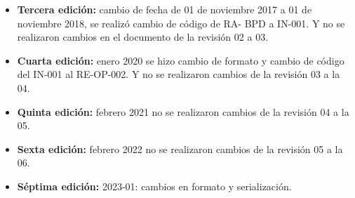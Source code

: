 \begin{itemize}
	\item \textbf{Tercera edición:} cambio de fecha de 01 de noviembre 2017 a 01 de noviembre 2018, se realizó cambio de código de RA- BPD a IN-001. Y no se realizaron cambios en el documento de la revisión 02 a 03.
	\item \textbf{Cuarta edición:} enero 2020 se hizo cambio de formato y cambio de código del IN-001 al RE-OP-002. Y no se realizaron cambios de la revisión 03 a la 04.
	\item \textbf{Quinta edición:} febrero 2021 no se realizaron cambios de la revisión 04 a la 05.
	\item \textbf{Sexta edición:} febrero 2022 no se realizaron cambios de la revisión 05 a la 06.
	\item \textbf{Séptima edición:} 2023-01: cambios en formato y serialización.
\end{itemize}

